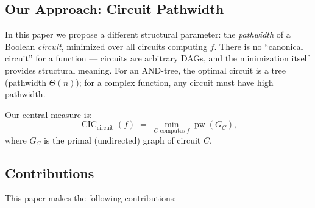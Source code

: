 \documentclass[11pt]{article}
\theoremstyle{plain}
\theoremstyle{definition}
\newcommand{\pw}{\operatorname{pw}}
\newcommand{\CIC}{\operatorname{CIC}}
\newcommand{\CICcirc}{\CIC_{\text{circuit}}}
\begin{document}
\subsection{Our Approach: Circuit Pathwidth}

In this paper we propose a different structural parameter: the \emph{pathwidth} of a Boolean \emph{circuit}, minimized over all circuits computing $f$. There is no ``canonical circuit'' for a function --- circuits are arbitrary DAGs, and the minimization itself provides structural meaning. For an AND-tree, the optimal circuit is a tree (pathwidth $\Theta(n)$); for a complex function, any circuit must have high pathwidth.

Our central measure is:
\[
\CICcirc(f) \;=\; \min_{C \text{ computes } f} \pw(G_C),
\]
where $G_C$ is the primal (undirected) graph of circuit $C$.

\subsection{Contributions}

This paper makes the following contributions:
\end{document}
